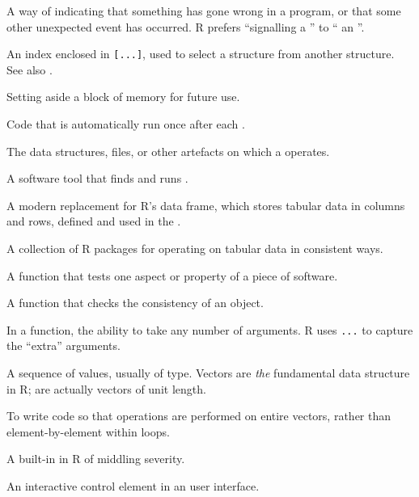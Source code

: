 \begin{description}
A way of indicating that something has gone wrong in a program,
or that some other unexpected event has occurred.
R prefers ``signalling a ''
to `` an ''.

An index enclosed in \texttt{[...]},
used to select a structure from another structure.
See also .

Setting aside a block of memory for future use.

Code that is automatically run once after each .

The data structures, files, or other artefacts on which a  operates.

A software tool that finds and runs .

A modern replacement for R's data frame,
which stores tabular data in columns and rows,
defined and used in the .

A collection of R packages for operating on tabular data in consistent ways.

A function that tests one aspect or property of a piece of software.

A function that checks the consistency of an  object.

In a function,
the ability to take any number of arguments.
R uses \texttt{...} to capture the ``extra'' arguments.

A sequence of values,
usually of  type.
Vectors are \emph{the} fundamental data structure in R;
 are actually vectors of unit length.

To write code so that operations are performed on entire vectors,
rather than element-by-element within loops.

A built-in  in R of middling severity.

An interactive control element in an user interface.

\end{description}
